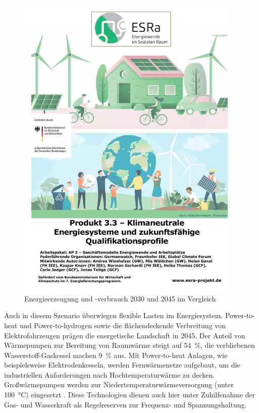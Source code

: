 		\begin{figure} [H]
			\centering
			\label{Abb. Energiesystem 2045} 
			\includegraphics[page=17,trim=45 210 45 90, clip, width=0.95\textwidth]{./anhang/Frauenhofer Studie.pdf}
			\caption{Energieerzeugung und -verbrauch 2030 und 2045 im Vergleich \cite[S.9]{ESRa_Fraunhofer}}
		\end{figure}
	
		Auch in diesem Szenario überwiegen flexible Lasten im Energiesystem. 
		Power-to-heat und Power-to-hydrogen sowie die flächendeckende Verbreitung von Elektrofahrzeugen prägen die energetische Landschaft in 2045.
		Der Anteil von Wärmepumpen zur Bereitung von Raumwärme steigt auf \SI{54}{\percent}, die verbliebenen Wasserstoff-Gaskessel machen \SI{9}{\percent} aus. 
		Mit Power-to-heat Anlagen, wie beispielsweise Elektrodenkesseln, werden Fernwärmenetze aufgebaut, um die industriellen Anforderungen nach Hochtemperaturwärme zu decken.
		Großwärmepumpen werden zur Niedertemperaturwärmeversorgung (unter \SI{100}{\degreeCelsius}) eingesetzt \cite[S.10ff]{ESRa_Fraunhofer}.
		Diese Technologien dienen auch hier unter Zuhilfenahme der Gas- und Wasserkraft als Regelreserven zur Frequenz- und Spannungshaltung.
		
